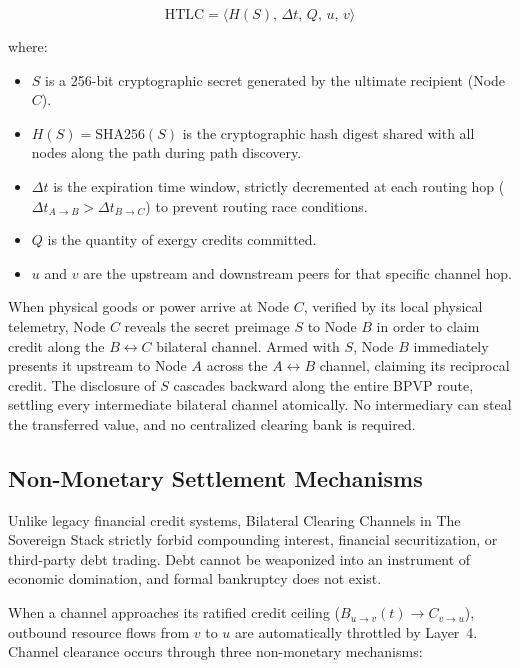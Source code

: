 \begin{equation}
\mathrm{HTLC} = \langle H(S), \, \Delta t, \, Q, \, u, \, v \rangle
\label{eq:ch4_htlc}
\end{equation}

where:
\begin{itemize}
  \item $S$ is a 256-bit cryptographic secret generated by the ultimate recipient (Node $C$).
  \item $H(S) = \mathrm{SHA256}(S)$ is the cryptographic hash digest shared with all nodes along the path during path discovery.
  \item $\Delta t$ is the expiration time window, strictly decremented at each routing hop ($\Delta t_{A \to B} > \Delta t_{B \to C}$) to prevent routing race conditions.
  \item $Q$ is the quantity of exergy credits committed.
  \item $u$ and $v$ are the upstream and downstream peers for that specific channel hop.
\end{itemize}

When physical goods or power arrive at Node $C$, verified by its local physical telemetry, Node $C$ reveals the secret preimage $S$ to Node $B$ in order to claim credit along the $B \leftrightarrow C$ bilateral channel. Armed with $S$, Node $B$ immediately presents it upstream to Node $A$ across the $A \leftrightarrow B$ channel, claiming its reciprocal credit. The disclosure of $S$ cascades backward along the entire BPVP route, settling every intermediate bilateral channel atomically. No intermediary can steal the transferred value, and no centralized clearing bank is required.

\subsection{Non-Monetary Settlement Mechanisms}

Unlike legacy financial credit systems, Bilateral Clearing Channels in The Sovereign Stack strictly forbid compounding interest, financial securitization, or third-party debt trading. Debt cannot be weaponized into an instrument of economic domination, and formal bankruptcy does not exist. 

When a channel approaches its ratified credit ceiling ($B_{u \to v}(t) \to C_{v \to u}$), outbound resource flows from $v$ to $u$ are automatically throttled by Layer~4. Channel clearance occurs through three non-monetary mechanisms:

